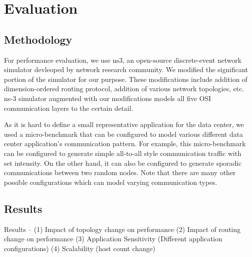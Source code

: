 \section{Evaluation}
\label{sec:eval}

\subsection {Methodology}
For performance evaluation, we use ns3, an open-source discrete-event network simulator devleoped by network research community. We modified the significant portion of the simulator for our purpose. These modifications include addition of dimension-ordered routing protocol, addition of various network topologies, etc. ns-3 simulator augmented with our modifications models all five OSI communication layers to the certain detail.

As it is hard to define a small representative application for the data center, we used a micro-benchmark that can be configured to model various different data center application's communication pattern. For example, this micro-benchmark can be configured to generate simple all-to-all style communication traffic with set intensity. On the other hand, it can also be configured to generate sporadic communications between two random nodes. Note that there are many other possible configurations which can model varying communication types.

\subsection {Results}
Results -- 
(1) Impact of topology change on performance
(2) Impact of routing change on performance
(3) Application Sensitivity (Different application configurations)
(4) Scalability (host count change)